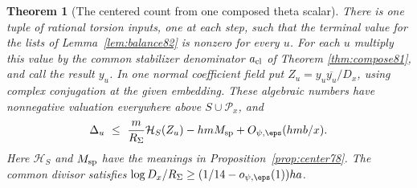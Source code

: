 \documentclass[a4paper,11pt]{article}
\newtheorem{theorem}[proposition]{Theorem}
\theoremstyle{definition}
\theoremstyle{remark}
\numberwithin{equation}{section}
\begin{document}
\begin{theorem}[The centered count from one composed theta scalar]
\label{thm:single82}
There is one tuple of rational torsion inputs, one at each step,
such that the terminal value for the lists of Lemma~\ref{lem:balance82}
is nonzero for every \(u\). For each \(u\) multiply this value by
the common stabilizer denominator \(a_{\rm cl}\) of Theorem \ref{thm:compose81}, and call the result \(y_u\). In one normal coefficient
field put \(Z_u=y_u\overline{y_u}/D_x\), using complex conjugation
at the given embedding. These algebraic numbers have nonnegative
valuation everywhere above \(S\cup\mathcal P_x\), and
\begin{equation}
  \Delta_u\ \le\
     \frac{m}{R_\Sigma}\mathcal H_S(Z_u)
         -hm M_{\rm sp}+O_{\psi,\eps}(hmb/x).                \label{eq:single82}
\end{equation}
Here \(\mathcal H_S\) and \(M_{\rm sp}\) have the meanings in
Proposition~\ref{prop:center78}. The common divisor satisfies
\(\log D_x/R_\Sigma\ge(1/14-o_{\psi,\eps}(1))ha\).
\end{theorem}
\end{document}

